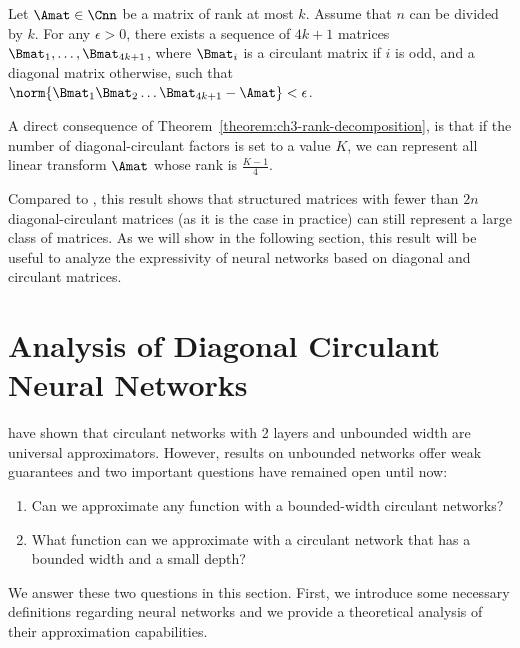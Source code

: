 \begin{theorem} \label{theorem:ch3-rank-decomposition}
Let $\Amat \in \Cnn$ be a matrix of rank at most $k$.
Assume that $n$ can be divided by $k$.
For any $\epsilon > 0$, there exists a sequence of $4k+1$ matrices $\Bmat_{1}, \ldots, \Bmat_{4k+1}$, where $\Bmat_{i}$ is a circulant matrix if $i$ is odd, and a diagonal matrix otherwise, such that $\norm{\Bmat_1 \Bmat_2 \ldots \Bmat_{4k+1} - \Amat} < \epsilon$.
\end{theorem}



A direct consequence of Theorem~\ref{theorem:ch3-rank-decomposition}, is that if the number of diagonal-circulant factors is set to a value $K$, we can represent all linear transform $\Amat$ whose rank is $\frac{K - 1}{4}$.

Compared to \citet{Huhtanen2015}, this result shows that structured matrices with fewer than $2n$ diagonal-circulant matrices (as it is the case in practice) can still represent a large class of matrices.
As we will show in the following section, this result will be useful to analyze the expressivity of neural networks based on diagonal and circulant matrices.


 \section{Analysis of Diagonal Circulant Neural Networks}
\label{section:ch3-analysis_of_diagonal_circulant_neural_networks}

\citet{pmlr-v70-zhao17b} have shown that circulant networks with 2 layers and unbounded width are universal approximators.
However, results on unbounded networks offer weak guarantees and two important questions have remained open until now: 
\begin{enumerate}
  \item Can we approximate any function with a bounded-width circulant networks?
  \item What function can we approximate with a circulant network that has a bounded width and a small depth?
\end{enumerate}

We answer these two questions in this section.
First, we introduce some necessary definitions regarding neural networks and we provide a theoretical analysis of their approximation capabilities.  


